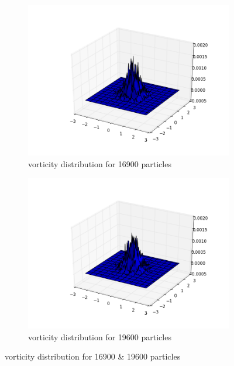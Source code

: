 \documentclass[a4paper,11pt]{article}
\begin{document}
\begin{figure}[h]
	\centering
	\begin{subfigure}[h]{.5\textwidth}
  		\centering
  		\includegraphics[width=.8\linewidth]{vorticity_distribution_for_16900_particles.png}
  		\caption{vorticity distribution for 16900 particles}
  		\label{fig:169}
	\end{subfigure}%
	\begin{subfigure}[h]{.5\textwidth}
  		\centering
  		\includegraphics[width=.8\linewidth]{vorticity_distribution_for_19600_particles.png}
  		\caption{vorticity distribution for 19600 particles}
  		\label{fig:196}
	\end{subfigure}
	\label{fig:Question 1a}
  \caption{vorticity distribution for 16900 \& 19600 particles}

\end{figure}
\end{document}
